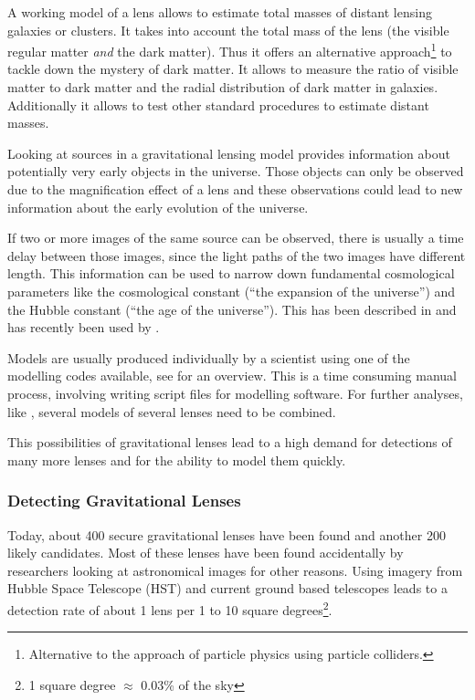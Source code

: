 \documentclass[11pt]{article}
\begin{document}

A working model of a lens allows to estimate total masses of distant lensing galaxies or clusters.
It takes into account the total mass of the lens (the visible regular matter \emph{and} the dark matter\cite{kochanek1995there}).
Thus it offers an alternative approach\footnote{Alternative to the approach of particle physics using particle colliders.} to tackle down the mystery of dark matter.
It allows to measure the ratio of visible matter to dark matter and the radial distribution of dark matter in galaxies\cite{treukoop04}.
Additionally it allows to test other standard procedures to estimate distant masses\cite{kochanek1995there}.

Looking at sources in a gravitational lensing model provides information about potentially very early objects in the universe.
Those objects can only be observed due to the magnification effect of a lens and these observations could lead to new information about the early evolution of the universe\cite{rusin03}.

If two or more images of the same source can be observed, there is usually a time delay between those images, since the light paths of the two images have different length.
This information can be used to narrow down fundamental cosmological parameters like the cosmological constant (``the expansion of the universe'') and the Hubble constant (``the age of the universe'').
This has been described in \cite{refsdal1964} and has recently been used by \cite{age_uni}.


Models are usually produced individually by a scientist using one of the modelling codes available, see \cite{overview_soft2013} for an overview.
This is a time consuming manual process, involving writing script files for modelling software.
For further analyses, like \cite{age_uni}, several models of several lenses need to be combined.

This possibilities of gravitational lenses lead to a high demand for detections of many more lenses and for the ability to model them quickly.



\subsubsection{Detecting Gravitational Lenses}

Today, about 400 secure gravitational lenses have been found and another 200 likely candidates.
Most of these lenses have been found accidentally by researchers looking at astronomical images for other reasons.
Using imagery from Hubble Space Telescope (HST) and current ground based telescopes leads to a detection rate of about 1 lens per 1 to 10 square degrees\footnote{1 square degree $\approx$ 0.03\% of the sky}.
\end{document}
